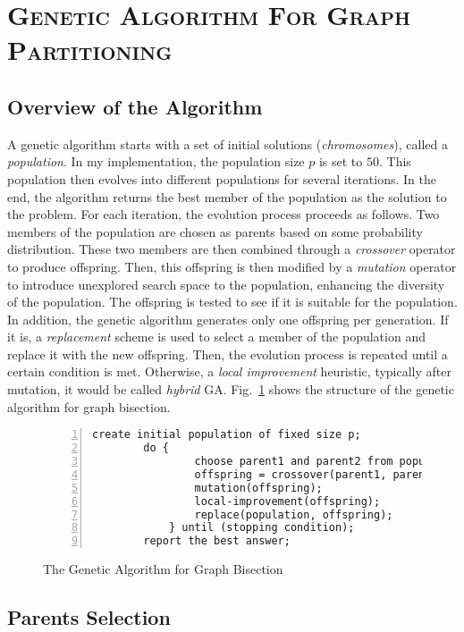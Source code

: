 \documentclass[11pt]{article}
\begin{document}
\section{\textsc{Genetic Algorithm For Graph Partitioning}}

\subsection{Overview of the Algorithm}

A genetic algorithm starts with a set of initial solutions (\textit{chromosomes}), called a 
\textit{population}. In my implementation, the population size \(p\) is set to \(50\). This 
population then evolves into different populations for several iterations. In the end, the algorithm
returns the best member of the population as the solution to the problem. For each iteration, the 
evolution process proceeds as follows. Two members of the population are chosen as parents based on
some probability distribution. These two members are then combined through a \textit{crossover} 
operator to produce offspring. Then, this offspring is then modified by a \textit{mutation} operator
to introduce unexplored search space to the population, enhancing the diversity of the population. 
The offspring is tested to see if it is suitable for the population. In addition, the genetic 
algorithm generates only one offspring per generation. If it is, a \textit{replacement} scheme is 
used to select a member of the population and replace it with the new offspring. Then, the evolution 
process is repeated until a certain condition is met. Otherwise, a \textit{local improvement} 
heuristic, typically after mutation, it would be called \textit{hybrid} GA. Fig.~\ref{alg:ga} shows 
the structure of the genetic algorithm for graph bisection.

\begin{figure}[H]
	\small
	\begin{Verbatim}[tabsize=4,xleftmargin=5mm,numbers=left]
		create initial population of fixed size p;
		do {
				choose parent1 and parent2 from population;
				offspring = crossover(parent1, parent2);
				mutation(offspring);
				local-improvement(offspring);
				replace(population, offspring);
			} until (stopping condition);
		report the best answer;
	\end{Verbatim}	
	\caption{The Genetic Algorithm for Graph Bisection}
	\label{alg:ga}
\end{figure}


\subsection{Parents Selection}
\end{document}
